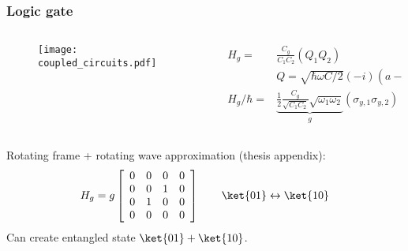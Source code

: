 \begin{frame}
\frametitle{Logic gate}
\begin{columns}
  \begin{column}{0.5\textwidth}
    \begin{figure}
      \texttt{[image: coupled\_circuits.pdf]}
    \end{figure}
  \end{column}
  \begin{column}{0.5\textwidth}
    \begin{align*}
      H_g =& \frac{C_g}{C_1 C_2} (Q_1 Q_2) \\
      &Q = \sqrt{\hbar \omega C / 2} (-i)(a - a^\dagger) \\
      H_g / \hbar =& \underbrace{\frac{1}{2} \frac{C_g}{\sqrt{C_1 C_2}} \sqrt{\omega_1 \omega_2}}_g (\sigma_{y,1} \sigma_{y,2} )
    \end{align*}
  \end{column}
\end{columns}
Rotating frame + rotating wave approximation (thesis appendix):
\begin{displaymath}
  H_g = g \left[ \begin{array}{cccc}0&0&0&0\\0&0&1&0\\0&1&0&0\\0&0&0&0 \end{array} \right]
  \qquad \ket{01} \leftrightarrow \ket{10}
\end{displaymath}
Can create entangled state $\ket{01} + \ket{10}$.
\end{frame}
